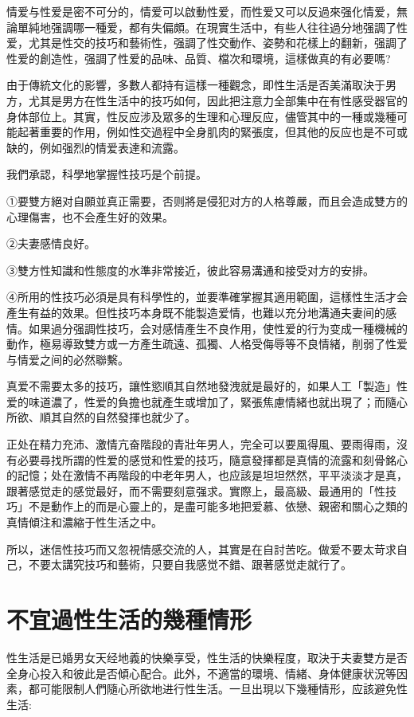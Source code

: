 \documentclass[12pt,UTF8]{ctexbook}
\begin{document}
情爱与性爱是密不可分的，情爱可以啟動性爱，而性爱又可以反過來强化情爱，無論單純地强調哪一種爱，都有失偏頗。在現實生活中，有些人往往過分地强調了性爱，尤其是性交的技巧和藝術性，强調了性交動作、姿勢和花樣上的翻新，强調了性爱的創造性，强調了性爱的品味、品質、檔次和環境，這樣做真的有必要嗎?

由于傳統文化的影響，多數人都持有這樣一種觀念，即性生活是否美滿取決于男方，尤其是男方在性生活中的技巧如何，因此把注意力全部集中在有性感受器官的身体部位上。其實，性反应涉及眾多的生理和心理反应，儘管其中的一種或幾種可能起著重要的作用，例如性交過程中全身肌肉的緊張度，但其他的反应也是不可或缺的，例如强烈的情爱表達和流露。

我們承認，科學地掌握性技巧是个前提。

①要雙方絕对自願並真正需要，否则將是侵犯对方的人格尊嚴，而且会造成雙方的心理傷害，也不会產生好的效果。

②夫妻感情良好。

③雙方性知識和性態度的水準非常接近，彼此容易溝通和接受对方的安排。

④所用的性技巧必須是具有科學性的，並要準確掌握其適用範圍，這樣性生活才会產生有益的效果。但性技巧本身既不能製造爱情，也難以充分地溝通夫妻间的感情。如果過分强調性技巧，会对感情產生不良作用，使性爱的行为变成一種機械的動作，極易導致雙方或一方產生疏遠、孤獨、人格受侮辱等不良情緒，削弱了性爱与情爱之间的必然聯繫。

真爱不需要太多的技巧，讓性慾順其自然地發洩就是最好的，如果人工「製造」性爱的味道濃了，性爱的負擔也就產生或增加了，緊張焦慮情緒也就出現了；而隨心所欲、順其自然的自然發揮也就少了。

正处在精力充沛、激情亢奋階段的青壯年男人，完全可以要風得風、要雨得雨，沒有必要尋找所謂的性爱的感觉和性爱的技巧，隨意發揮都是真情的流露和刻骨銘心的記憶；处在激情不再階段的中老年男人，也应該是坦坦然然，平平淡淡才是真，跟著感觉走的感觉最好，而不需要刻意强求。實際上，最高級、最通用的「性技巧」不是動作上的而是心靈上的，是盡可能多地把爱慕、依戀、親密和關心之類的真情傾注和濃縮于性生活之中。

所以，迷信性技巧而又忽視情感交流的人，其實是在自討苦吃。做爱不要太苛求自己，不要太講究技巧和藝術，只要自我感觉不錯、跟著感觉走就行了。

\section{不宜過性生活的幾種情形}

性生活是已婚男女天经地義的快樂享受，性生活的快樂程度，取決于夫妻雙方是否全身心投入和彼此是否傾心配合。此外，不適當的環境、情緒、身体健康状況等因素，都可能限制人們隨心所欲地进行性生活。一旦出現以下幾種情形，应該避免性生活:
\end{document}
